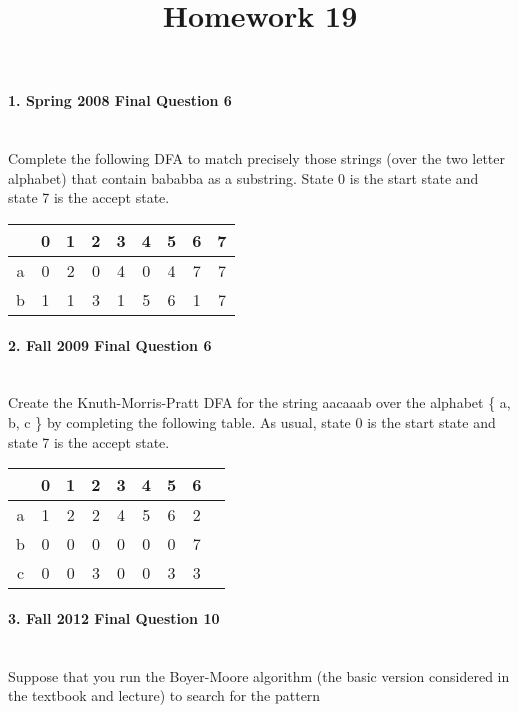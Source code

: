 \documentclass{article}
\begin{document}
\title{Homework 19}
\date{}
\maketitle


\paragraph{\Large 1. Spring 2008 Final Question 6}\mbox{}\\
Complete the following DFA to match precisely those strings (over the two letter alphabet) that contain bababba as a substring. State 0 is the start state and state 7 is the accept state.\\

\begin{tabular}{c | c c c c c c c c}
  & 0 & 1 & 2 & 3 & 4 & 5 & 6 & 7\\ \hline
a & 0 & 2 & 0 & 4 & 0 & 4 & 7 & 7 \\
b & 1 & 1 & 3 & 1 & 5 & 6 & 1 & 7 
\end{tabular}

\paragraph{\Large 2. Fall 2009 Final Question 6}\mbox{}\\
Create the Knuth-Morris-Pratt DFA for the string aacaaab over the alphabet \{ a, b, c \} by completing the following table. As usual, state 0 is the start state and state 7 is the accept state.\\

\begin{tabular}{c | c c c c c c c c}
  & 0 & 1 & 2 & 3 & 4 & 5 & 6\\ \hline
a & 1 & 2 & 2 & 4 & 5 & 6 & 2\\
b & 0 & 0 & 0 & 0 & 0 & 0 & 7\\
c & 0 & 0 & 3 & 0 & 0 & 3 & 3
\end{tabular}

\paragraph{\Large 3. Fall 2012 Final Question 10}\mbox{}\\
Suppose that you run the Boyer-Moore algorithm (the basic version considered in the textbook
and lecture) to search for the pattern\\
\end{document}
